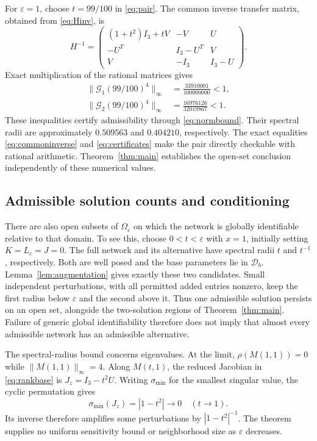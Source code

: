 \documentclass[letterpaper,10pt,conference]{ieeeconf}
\begin{document}
For \(\varepsilon=1\), choose \(t=99/100\) in \eqref{eq:pair}.
The common inverse transfer matrix, obtained from \eqref{eq:Hinv}, is
\begin{equation}\label{eq:commoninverse}
 H^{-1}=
 \begin{pmatrix}
 (1+t^2)I_3+tV&-V&U\\
 -U^T&I_3-U^T&V\\
 V&-I_3&I_3-U
 \end{pmatrix}.
\end{equation}
Exact multiplication of the rational matrices gives
\begin{equation}\label{eq:certificates}
\begin{split}
 \|\mathcal G_1(99/100)^4\|_\infty
     &=\frac{33910001}{100000000}<1,\\
 \|\mathcal G_2(99/100)^4\|_\infty
     &=\frac{16976126}{32019867}<1.
\end{split}
\end{equation}
These inequalities certify admissibility through \eqref{eq:normbound}.
Their spectral radii are approximately \(0.509563\) and \(0.404210\),
respectively. The exact equalities \eqref{eq:commoninverse} and
\eqref{eq:certificates} make the pair directly checkable with rational
arithmetic. Theorem~\ref{thm:main} establishes the open-set conclusion
independently of these numerical values.

\subsection{Admissible solution counts and conditioning}

There are also open subsets of \(\Omega_\varepsilon\) on which
the network is globally identifiable relative to that domain.
To see this, choose \(0<t<\varepsilon\) with \(x=1\), initially
setting \(K=L_c=J=0\). The full network and its alternative have
spectral radii \(t\) and \(t^{-1}\), respectively.
Both are well posed and the base parameters lie in \(\mathcal D_b\).
Lemma~\ref{lem:augmentation} gives exactly these two candidates.
Small independent perturbations, with all permitted added entries
nonzero, keep the first radius below \(\varepsilon\) and the second
above it. Thus one admissible solution persists on an open set,
alongside the two-solution regions of Theorem~\ref{thm:main}.
Failure of generic global identifiability therefore does not imply
that almost every admissible network has an admissible alternative.

The spectral-radius bound concerns eigenvalues. At the limit,
\(\rho(M(1,1))=0\) while \(\|M(1,1)\|_\infty=4\).
Along \(M(t,1)\), the reduced Jacobian in \eqref{eq:rankbase} is
\(J_z=I_3-t^2U\). Writing \(\sigma_{\min}\) for the smallest
singular value, the cyclic permutation gives
\[
 \sigma_{\min}(J_z)=|1-t^2|\longrightarrow0\quad(t\to1).
\]
Its inverse therefore amplifies some perturbations by
\(|1-t^2|^{-1}\). The theorem supplies no uniform sensitivity
bound or neighborhood size as \(\varepsilon\) decreases.
\end{document}
